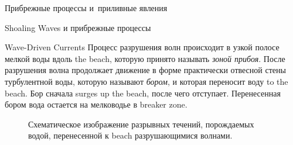 \begin{chapter}{Прибрежные процессы и~приливные явления}
\begin{section}{Shoaling Waves и прибрежные процессы}
\begin{paragraph}{Wave-Driven Currents}
Процесс разрушения
волн происходит в узкой полосе мелкой воды вдоль the beach, 
которую принято называть \emph{зоной прибоя}. 
После разрушения волна продолжает движение в форме практически отвесной
стены турбулентной воды, которую называют \emph{бором},
и которая переносит воду to the beach. Бор сначала surges up the beach, 
после чего отступает. Перенесенная бором вода остается на мелководье
в breaker zone.
%

\begin{figure}[b!]
\caption{Схематическое изображение разрывных течений,
порождаемых водой, перенесенной к beach разрушающимися волнами.}
\label{fig:rips}
\end{figure}
%
%


\end{paragraph}
\end{section}
\end{chapter}
